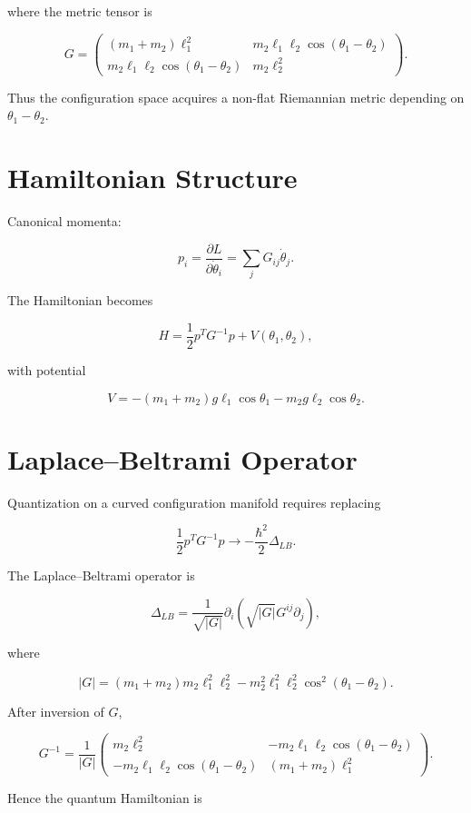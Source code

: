 \documentclass[11pt]{article}
\begin{document}
where the metric tensor is

\[
G =
\begin{pmatrix}
(m_1+m_2)\ell_1^2 &
m_2 \ell_1 \ell_2 \cos(\theta_1-\theta_2) \\
m_2 \ell_1 \ell_2 \cos(\theta_1-\theta_2) &
m_2 \ell_2^2
\end{pmatrix}.
\]

Thus the configuration space acquires a non-flat
Riemannian metric depending on $\theta_1-\theta_2$.

\section{Hamiltonian Structure}

Canonical momenta:

\[
p_i = \frac{\partial L}{\partial \dot\theta_i}
= \sum_j G_{ij} \dot\theta_j.
\]

The Hamiltonian becomes

\[
H = \frac12 p^T G^{-1} p + V(\theta_1,\theta_2),
\]

with potential

\[
V =
-(m_1+m_2)g\ell_1\cos\theta_1
- m_2 g\ell_2 \cos\theta_2.
\]

\section{Laplace--Beltrami Operator}

Quantization on a curved configuration manifold
requires replacing

\[
\frac12 p^T G^{-1} p
\longrightarrow
-\frac{\hbar^2}{2} \Delta_{LB}.
\]

The Laplace--Beltrami operator is

\[
\Delta_{LB}
=
\frac{1}{\sqrt{|G|}}
\partial_i
\left(
\sqrt{|G|}
G^{ij}
\partial_j
\right),
\]

where

\[
|G|
=
(m_1+m_2)m_2\ell_1^2\ell_2^2
-
m_2^2\ell_1^2\ell_2^2
\cos^2(\theta_1-\theta_2).
\]

After inversion of $G$,

\[
G^{-1}
=
\frac{1}{|G|}
\begin{pmatrix}
m_2\ell_2^2 &
- m_2 \ell_1 \ell_2 \cos(\theta_1-\theta_2) \\
- m_2 \ell_1 \ell_2 \cos(\theta_1-\theta_2) &
(m_1+m_2)\ell_1^2
\end{pmatrix}.
\]

Hence the quantum Hamiltonian is
\end{document}
